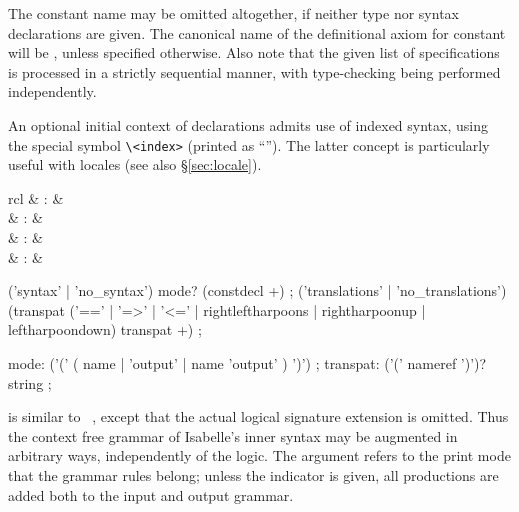 \begin{isabellebody}
\begin{isamarkuptext}
\begin{descr}
  The constant name may be omitted altogether, if neither type nor
  syntax declarations are given.  The canonical name of the
  definitional axiom for constant  will be ,
  unless specified otherwise.  Also note that the given list of
  specifications is processed in a strictly sequential manner, with
  type-checking being performed independently.
  
  An optional initial context of  declarations
  admits use of indexed syntax, using the special symbol \verb|\<index>| (printed as ``\isa{{\isachardoublequote}{\isasymindex}{\isachardoublequote}}'').  The latter concept is
  particularly useful with locales (see also \S\ref{sec:locale}).

  \end{descr}%
\end{isamarkuptext}%
\isamarkuptrue%
%
\isamarkuptrue%
%
\begin{isamarkuptext}%
\begin{matharray}{rcl}
    \mbox{} & : &  \\
    \mbox{} & : &  \\
    \mbox{} & : &  \\
    \mbox{} & : &  \\
  \end{matharray}

  \begin{rail}
    ('syntax' | 'no\_syntax') mode? (constdecl +)
    ;
    ('translations' | 'no\_translations') (transpat ('==' | '=>' | '<=' | rightleftharpoons | rightharpoonup | leftharpoondown) transpat +)
    ;

    mode: ('(' ( name | 'output' | name 'output' ) ')')
    ;
    transpat: ('(' nameref ')')? string
    ;
  \end{rail}

  \begin{descr}
  
  \item [\mbox{\isa{\isacommand{syntax}}}~\isa{{\isachardoublequote}{\isacharparenleft}mode{\isacharparenright}\ decls{\isachardoublequote}}] is similar to
  \mbox{}~, except that the actual logical
  signature extension is omitted.  Thus the context free grammar of
  Isabelle's inner syntax may be augmented in arbitrary ways,
  independently of the logic.  The  argument refers to the
  print mode that the grammar rules belong; unless the \mbox{} indicator is given, all productions are added both to the
  input and output grammar.
  

\end{descr}
\end{isamarkuptext}
\end{isabellebody}
